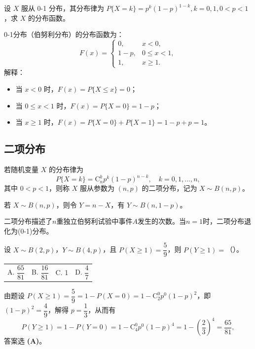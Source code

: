 \documentclass[lang=cn,11pt]{elegantbook}
\begin{document}
\begin{exercise}[（0-1）分布的分布函数] \label{exer:2-44}
设 $X$ 服从 0-1 分布，其分布律为 $P\{X=k\}=p^k(1-p)^{1-k}, k=0,1, 0<p<1$，求 $X$ 的分布函数。
\end{exercise}
\begin{solution}
0-1分布（伯努利分布）的分布函数为：
\[
F(x)=
\begin{cases}
0, & x<0, \\[6pt]
1-p, & 0\leqslant x<1, \\[6pt]
1, & x\geqslant1.
\end{cases}
\]
解释：
\begin{itemize}
    \item 当 $x<0$ 时，$F(x)=P\{X\leqslant x\}=0$；
    \item 当 $0\leqslant x<1$ 时，$F(x)=P\{X=0\}=1-p$；
    \item 当 $x\geqslant1$ 时，$F(x)=P\{X=0\}+P\{X=1\}=1-p+p=1$。
\end{itemize}
\end{solution}


\subsection{二项分布} \label{subsec:binomial-dist}
\begin{definition}[二项分布]\label{def:binomial-dist}
若随机变量 $X$ 的分布律为
\[
P\{X = k\} = \mathrm{C}_n^k p^k (1-p)^{n-k},\quad k=0,1,\dots,n,
\]
其中 $0 < p < 1$，则称 $X$ 服从参数为 $(n,p)$ 的二项分布，记为 $X \sim B(n,p)$。
\end{definition}

\begin{property}\label{prop:binomial-trans}
若 $X \sim B(n,p)$，则令 $Y = n - X$，有 $Y \sim B(n,1-p)$。
\end{property}

\begin{note}
二项分布描述了$n$重独立伯努利试验中事件$A$发生的次数。当$n=1$时，二项分布退化为(0-1)分布。
\end{note}

\begin{exercise}[二项分布参数求解] \label{exer:2-33}
设 $X\sim B(2,p)$，$Y\sim B(4,p)$，且 $P(X\geqslant1)=\dfrac{5}{9}$，则 $P(Y\geqslant1)=$（\quad）。
\begin{tabular}{llll}
A. $\dfrac{65}{81}$ & B. $\dfrac{16}{81}$ & C. 1 & D. $\dfrac{4}{7}$
\end{tabular}
\end{exercise}
\begin{solution}
由题设 $P(X\geqslant1)=\dfrac{5}{9}=1-P(X=0)=1-\mathrm{C}_2^0p^0(1-p)^2$，即 $(1-p)^2=\dfrac{4}{9}$，解得 $p=\dfrac{1}{3}$，从而有
\[
P(Y\geqslant1)=1-P(Y=0)=1-\mathrm{C}_4^0p^0(1-p)^4=1-\left(\frac{2}{3}\right)^4=\frac{65}{81},
\]
答案选 \textbf{(A)}。
\end{solution}
\end{document}
